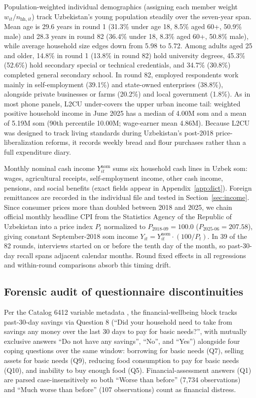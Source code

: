 \documentclass[11pt]{article}
\begin{document}
Population-weighted individual demographics (assigning each member weight $w_{it} / n_{\text{hh},it}$) track Uzbekistan's young population steadily over the seven-year span. Mean age is 29.6 years in round 1 (31.3\% under age 18, 8.5\% aged 60+, 50.9\% male) and 28.3 years in round 82 (36.4\% under 18, 8.3\% aged 60+, 50.8\% male), while average household size edges down from 5.98 to 5.72. Among adults aged 25 and older, 14.8\% in round 1 (13.8\% in round 82) hold university degrees, 45.3\% (52.6\%) hold secondary special or technical credentials, and 34.7\% (30.8\%) completed general secondary school. In round 82, employed respondents work mainly in self-employment (39.1\%) and state-owned enterprises (38.8\%), alongside private businesses or farms (20.2\%) and local government (1.8\%). As in most phone panels, L2CU under-covers the upper urban income tail: weighted positive household income in June 2025 has a median of 4.00M som and a mean of 5.19M som (90th percentile 10.00M; wage-earner mean 4.86M). Because L2CU was designed to track living standards during Uzbekistan's post-2018 price-liberalization reforms, it records weekly bread and flour purchases rather than a full expenditure diary.

Monthly nominal cash income $Y_{it}^{\text{nom}}$ sums six household cash lines in Uzbek som: wages, agricultural receipts, self-employment income, other cash income, pensions, and social benefits (exact fields appear in Appendix~\ref{app:dict}). Foreign remittances are recorded in the individual file and tested in Section~\ref{sec:income}. Since consumer prices more than doubled between 2018 and 2025, we chain official monthly headline CPI from the Statistics Agency of the Republic of Uzbekistan \citep{StatUz2026CPI} into a price index $P_t$ normalized to $P_{\text{2018-09}} = 100.0$ ($P_{\text{2025-06}} = 207.58$), giving constant September-2018 som income $Y_{it} = Y_{it}^{\text{nom}} \cdot (100 / P_t)$. In 39 of the 82 rounds, interviews started on or before the tenth day of the month, so past-30-day recall spans adjacent calendar months. Round fixed effects in all regressions and within-round comparisons absorb this timing drift.

\subsection{Forensic audit of questionnaire discontinuities}\label{sec:forensic}

Per the Catalog 6412 variable metadata \citep{WB2025L2CU}, the financial-wellbeing block tracks past-30-day savings via Question 8 (``Did your household need to take from savings any money over the last 30 days to pay for basic needs?'', with mutually exclusive answers ``Do not have any savings'', ``No'', and ``Yes'') alongside four coping questions over the same window: borrowing for basic needs (Q7), selling assets for basic needs (Q9), reducing food consumption to pay for basic needs (Q10), and inability to buy enough food (Q5). Financial-assessment answers (Q1) are parsed case-insensitively so both ``Worse than before'' (7,734 observations) and ``Much worse than before'' (107 observations) count as financial distress.
\end{document}
